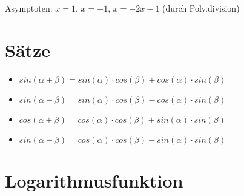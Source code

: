 Asymptoten: $x=1$, $x=-1$, $x=-2x-1$ (durch Poly.division)


\section*{Sätze}
\begin{itemize}
\item $sin(\alpha+\beta)=sin(\alpha)\cdot cos(\beta)+cos(\alpha)\cdot sin(\beta)$
\item $sin(\alpha-\beta)=sin(\alpha)\cdot cos(\beta)-cos(\alpha)\cdot sin(\beta)$
\item $cos(\alpha+\beta)=cos(\alpha)\cdot cos(\beta)+sin(\alpha)\cdot sin(\beta)$
\item $sin(\alpha-\beta)=cos(\alpha)\cdot cos(\beta)-sin(\alpha)\cdot sin(\beta)$
\end{itemize}

\section*{Logarithmusfunktion}

